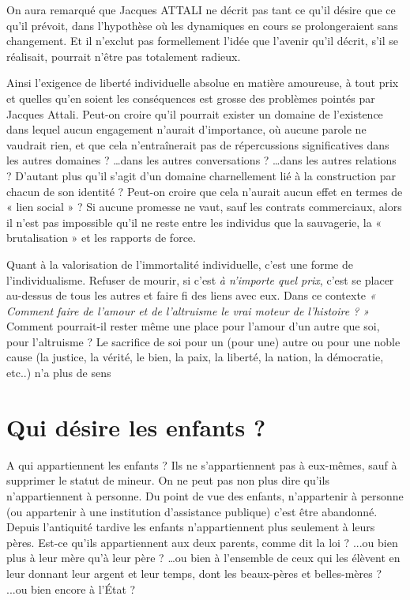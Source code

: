 On aura remarqué que Jacques ATTALI ne décrit pas tant ce qu'il désire que ce qu'il prévoit, dans l'hypothèse où les dynamiques en cours se prolongeraient sans changement. Et il n'exclut pas formellement l'idée que l'avenir qu'il décrit, s'il se réalisait, pourrait n'être pas totalement radieux. 



 Ainsi l'exigence de liberté individuelle absolue en matière amoureuse, à tout prix et quelles qu'en soient les conséquences est grosse des problèmes pointés par Jacques Attali. Peut-on croire qu'il pourrait exister un domaine de l'existence dans lequel aucun engagement n'aurait d'importance, où aucune parole ne vaudrait rien, et que cela n'entraînerait pas de répercussions significatives dans les autres domaines ? …dans les autres conversations ? …dans les autres relations ? D’autant plus qu'il s'agit d'un domaine charnellement lié à la construction par chacun de son identité ? Peut-on croire que cela n'aurait aucun effet en termes de « lien social » ? Si  aucune promesse ne vaut, sauf les contrats commerciaux, alors il n’est pas impossible qu’il ne reste entre les individus que la sauvagerie, la « brutalisation » et les rapports de force. 
 
 Quant à la valorisation de l'immortalité individuelle, c'est une forme de l'individualisme. Refuser de mourir, si c'est \emph{à n'importe quel prix}, c'est se placer au-dessus de tous les autres et faire fi des liens avec eux. Dans ce contexte \emph{« Comment faire de l'amour et de l'altruisme le vrai moteur de l'histoire ? »} Comment pourrait-il rester même une place pour l'amour d'un autre que soi, pour l'altruisme ? Le sacrifice de soi pour un (pour une) autre ou pour une noble cause (la justice, la vérité, le bien, la paix, la liberté, la nation, la démocratie, etc..) n'a plus de sens 



 


\section{Qui désire les enfants ?} 

 
 A qui appartiennent les enfants ?  Ils ne s'appartiennent pas à eux-mêmes, sauf à supprimer le statut de mineur. On ne peut pas non plus dire qu'ils n'appartiennent à personne. Du point de vue des enfants, n'appartenir à personne (ou appartenir à une institution d'assistance publique) c'est être abandonné. 
 Depuis l’antiquité tardive les enfants n'appartiennent plus seulement à leurs pères. Est-ce qu'ils appartiennent aux deux parents, comme dit la loi ? ...ou bien plus à leur mère qu’à leur père ? …ou bien à l'ensemble de ceux qui les élèvent en leur donnant leur argent et leur temps, dont les beaux-pères et belles-mères ? ...ou bien encore à l'État ? 
 
